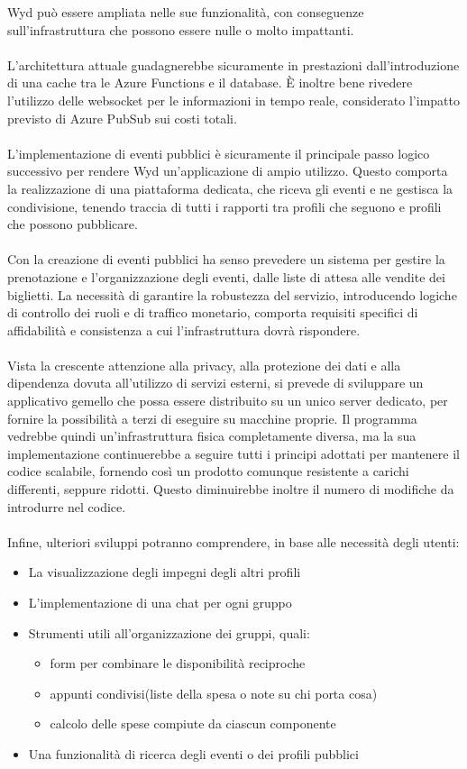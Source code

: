 Wyd può essere ampliata nelle sue funzionalità,
con conseguenze sull'infrastruttura che possono essere nulle o molto impattanti.\\
\\
L'architettura attuale guadagnerebbe sicuramente in prestazioni dall'introduzione
di una cache tra le Azure Functions e il database.
È inoltre bene rivedere l'utilizzo delle websocket per le informazioni in tempo reale, 
considerato l'impatto previsto di Azure PubSub sui costi totali.\\
\\
L'implementazione di eventi pubblici è sicuramente il principale passo logico successivo 
per rendere Wyd un'applicazione di ampio utilizzo.
Questo comporta la realizzazione di una piattaforma dedicata,
che riceva gli eventi e ne gestisca la condivisione,
tenendo traccia di tutti i rapporti tra profili che seguono e 
profili che possono pubblicare.\\
\\
Con la creazione di eventi pubblici ha senso prevedere un sistema 
per gestire la prenotazione e l'organizzazione degli eventi,
dalle liste di attesa alle vendite dei biglietti.
La necessità di garantire la robustezza del servizio,
introducendo logiche di controllo dei ruoli e di traffico monetario,
comporta requisiti specifici di affidabilità e consistenza 
a cui l'infrastruttura dovrà rispondere.\\
\\
Vista la crescente attenzione alla privacy, 
alla protezione dei dati e alla dipendenza dovuta all'utilizzo di servizi esterni,
si prevede di sviluppare un applicativo gemello 
che possa essere distribuito su un unico server dedicato,
per fornire la possibilità a terzi di eseguire su macchine proprie.
Il programma vedrebbe quindi un'infrastruttura fisica completamente diversa,
ma la sua implementazione continuerebbe a seguire
tutti i principi adottati per mantenere il codice scalabile,
fornendo così un prodotto comunque resistente a carichi differenti, seppure ridotti.
Questo diminuirebbe inoltre il numero di modifiche da introdurre nel codice.\\
\\
Infine, ulteriori sviluppi potranno comprendere, in base alle necessità degli utenti:
\begin{itemize}
    \item La visualizzazione degli impegni degli altri profili
    \item L'implementazione di una chat per ogni gruppo
    \item Strumenti utili all'organizzazione dei gruppi, quali:
          \begin{itemize}
              \item form per combinare le disponibilità reciproche
              \item appunti condivisi(liste della spesa o note su chi porta cosa)
              \item calcolo delle spese compiute da ciascun componente
          \end{itemize}
    \item Una funzionalità di ricerca degli eventi o dei profili pubblici
\end{itemize}
\clearpage
